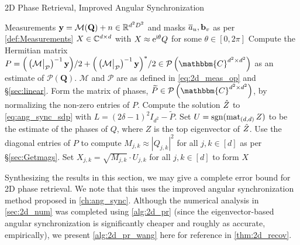 \begin{algorithm}[htbp]
\renewcommand{\algorithmicrequire}{\textbf{Input:}}
\renewcommand{\algorithmicensure}{\textbf{Output:}}
\caption{2D Phase Retrieval, Improved Angular Synchronization}
\label{alg:2d_pr_wang}
\begin{algorithmic}[1]
    \REQUIRE Measurements $\mathbf{y} = \mathcal{M}(\mathbf{Q}) + n \in \mathbb{R}^{d^2 D^2}$ and masks $\overline{a}_u, \mathbf b_v$ as per \eqref{def:Measurements}
    \ENSURE $X \in \mathbb{C}^{d \times d}$ with $X \approx \mathrm{e}^{\mathrm{i} \theta} Q$ for some $\theta \in [0, 2 \pi]$ 
    \STATE Compute the Hermitian matrix $P = \Big( \left(\mathcal{M} \big|_{\mathcal{P}}\right)^{-1} {\bf y}\Big)/2 + \Big( \left(\Mc \big|_{\mathcal{P}}\right)^{-1} {\bf y}\Big)^*/2  \in \mathcal{P}\left(\mathbbm{C}^{d^2\times d^2}\right)$ as an estimate of $\mathcal{P} \left( \mathbf{Q} \right)$.  $\mathcal{M}$ and $\mathcal{P}$ are as defined in \eqref{eq:2d_meas_op} and \S\ref{sec:linear}.
    \STATE Form the matrix of phases, $\widetilde{P} \in \mathcal{P}\left(\mathbbm{C}^{d^2\times d^2}\right)$, by normalizing the non-zero entries of $P$.
    \STATE Compute the solution $\hat{Z}$ to \eqref{eq:ang_sync_sdp} with $L = (2 \delta - 1)^2 I_{d^2} - \widetilde{P}$.  Set $U = \operatorname{sgn}(\operatorname{mat}_{(d, d)} Z)$ to be the estimate of the phases of $Q$, where $Z$ is the top eigenvector of $\hat{Z}$.
    \STATE Use the diagonal entries of $P$ to compute $M_{j,k} \approx \left| Q_{j,k} \right|^2$ for all $j,k \in [d]$ as per \S\ref{sec:Getmags}.
    \STATE Set $X_{j,k} = \sqrt{M_{j,k}} \cdot U_{j,k}$ for all $j,k \in [d]$ to form $X$
    \end{algorithmic}
\end{algorithm}

Synthesizing the results in this section, we may give a complete error bound for 2D phase retrieval.  We note that this uses the improved angular synchronization method proposed in \cref{ch:ang_sync}.  Although the numerical analysis in \cref{sec:2d_num} was completed using \cref{alg:2d_pr} (since the eigenvector-based angular synchronization is significantly cheaper and roughly as accurate, empirically), we present \cref{alg:2d_pr_wang} here for reference in \cref{thm:2d_recov}.

